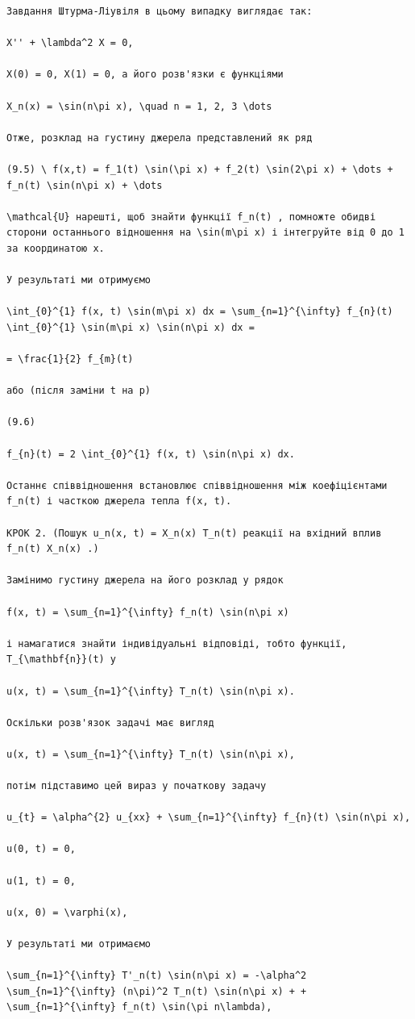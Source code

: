 \documentclass[
  ukrainian,
]{article}
\begin{document}
\begin{verbatim}
Завдання Штурма-Ліувіля в цьому випадку виглядає так:

X'' + \lambda^2 X = 0,

X(0) = 0, X(1) = 0, а його розв'язки є функціями

X_n(x) = \sin(n\pi x), \quad n = 1, 2, 3 \dots

Отже, розклад на густину джерела представлений як ряд

(9.5) \ f(x,t) = f_1(t) \sin(\pi x) + f_2(t) \sin(2\pi x) + \dots + f_n(t) \sin(n\pi x) + \dots

\mathcal{U} нарешті, щоб знайти функції f_n(t) , помножте обидві сторони останнього відношення на \sin(m\pi x) і інтегруйте від 0 до 1 за координатою x.

У результаті ми отримуємо

\int_{0}^{1} f(x, t) \sin(m\pi x) dx = \sum_{n=1}^{\infty} f_{n}(t) \int_{0}^{1} \sin(m\pi x) \sin(n\pi x) dx =

= \frac{1}{2} f_{m}(t)

або (після заміни t на p)

(9.6)

f_{n}(t) = 2 \int_{0}^{1} f(x, t) \sin(n\pi x) dx.

Останнє співвідношення встановлює співвідношення між коефіцієнтами f_n(t) і часткою джерела тепла f(x, t).

КРОК 2. (Пошук u_n(x, t) = X_n(x) T_n(t) реакції на вхідний вплив f_n(t) X_n(x) .)

Замінимо густину джерела на його розклад у рядок

f(x, t) = \sum_{n=1}^{\infty} f_n(t) \sin(n\pi x)

і намагатися знайти індивідуальні відповіді, тобто функції, T_{\mathbf{n}}(t) у

u(x, t) = \sum_{n=1}^{\infty} T_n(t) \sin(n\pi x).

Оскільки розв'язок задачі має вигляд

u(x, t) = \sum_{n=1}^{\infty} T_n(t) \sin(n\pi x),

потім підставимо цей вираз у початкову задачу

u_{t} = \alpha^{2} u_{xx} + \sum_{n=1}^{\infty} f_{n}(t) \sin(n\pi x),

u(0, t) = 0,

u(1, t) = 0,

u(x, 0) = \varphi(x),

У результаті ми отримаємо

\sum_{n=1}^{\infty} T'_n(t) \sin(n\pi x) = -\alpha^2 \sum_{n=1}^{\infty} (n\pi)^2 T_n(t) \sin(n\pi x) + + \sum_{n=1}^{\infty} f_n(t) \sin(\pi n\lambda),


\end{verbatim}
\end{document}
